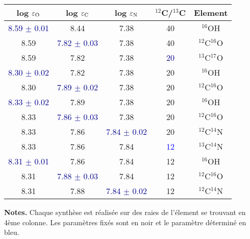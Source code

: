 \documentclass{article}
\begin{document}
\begin{table}[h!]
  \vspace{0.3cm}
\begin{center}
	\begin{tabular}{ccccc}
        \hline
		\hline
        log $\varepsilon_{\rm O}$ & log $\varepsilon_{\rm C}$ & log $\varepsilon_{\rm N}$ & $^{12}$C/$^{13}$C & Element\\
        \hline
    \textcolor{darkblue}{8.59 $\pm$ 0.01} & 8.44 & 7.38 & 40 & $^{16}$OH \\
    8.59 & \textcolor{darkblue}{7.82 $\pm$ 0.03} & 7.38 & 40 & $^{12}$C$^{16}$O \\
    8.59 & 7.82 & 7.38 & \textcolor{darkblue}{20} & $^{13}$C$^{17}$O \\
    \textcolor{darkblue}{8.30 $\pm$ 0.02} & 7.82 & 7.38 & 20 & $^{16}$OH \\
    8.30 & \textcolor{darkblue}{7.89 $\pm$ 0.02} & 7.38 & 20 & $^{12}$C$^{16}$O \\
    \textcolor{darkblue}{8.33 $\pm$ 0.02} & 7.89 & 7.38 & 20 & $^{16}$OH \\
    8.33 & \textcolor{darkblue}{7.86 $\pm$ 0.03} & 7.38 & 20 & $^{12}$C$^{16}$O \\
    8.33 & 7.86 & \textcolor{darkblue}{7.84 $\pm$ 0.02} & 20 & $^{12}$C$^{14}$N \\
    8.33 & 7.86 & 7.84 & \textcolor{blue}{12} & $^{13}$C$^{14}$N \\
    \textcolor{darkblue}{8.31 $\pm$ 0.01} & 7.86 & 7.84 & 12 & $^{16}$OH \\
    8.31 & \textcolor{darkblue}{7.88 $\pm$ 0.03} & 7.84 & 12 & $^{12}$C$^{16}$O \\
    8.31 & 7.88 & \textcolor{darkblue}{7.84 $\pm$ 0.02} & 12 & $^{12}$C$^{14}$N \\
    \end{tabular}
\end{center} 
\textbf{Notes.} 
Chaque synthèse est réalisée sur des raies de l'élement se trouvant en 4ème colonne. 
Les paramètres fixés sont en noir et le paramètre déterminé en bleu. 
\label{itération_CNO}
\end{table}

  
  
\end{document}

